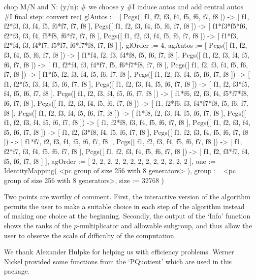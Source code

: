 chop M/N and N: (y/n):                      # we choose y 
#I    induce autos and add central autos
#I  final step: convert
rec( 
  glAutos := [ Pcgs([ f1, f2, f3, f4, f5, f6, f7, f8 ]) -> [ f1, f2*f3, f3, 
          f4, f5, f6*f7, f7, f8 ], 
      Pcgs([ f1, f2, f3, f4, f5, f6, f7, f8 ]) -> 
        [ f1*f3*f5*f6, f2*f3, f3, f4, f5*f8, f6*f7, f7, f8 ], 
      Pcgs([ f1, f2, f3, f4, f5, f6, f7, f8 ]) -> 
        [ f1*f3, f2*f4, f3, f4*f7, f5*f7, f6*f7*f8, f7, f8 ] ], glOrder := 4, 
  agAutos := 
    [ Pcgs([ f1, f2, f3, f4, f5, f6, f7, f8 ]) -> [ f1*f4, f2, f3, f4*f8, f5, 
          f6, f7, f8 ], Pcgs([ f1, f2, f3, f4, f5, f6, f7, f8 ]) -> 
        [ f1, f2*f4, f3, f4*f7, f5, f6*f7*f8, f7, f8 ], 
      Pcgs([ f1, f2, f3, f4, f5, f6, f7, f8 ]) -> 
        [ f1*f5, f2, f3, f4, f5, f6, f7, f8 ], 
      Pcgs([ f1, f2, f3, f4, f5, f6, f7, f8 ]) -> 
        [ f1, f2*f5, f3, f4, f5, f6, f7, f8 ], 
      Pcgs([ f1, f2, f3, f4, f5, f6, f7, f8 ]) -> 
        [ f1, f2, f3*f5, f4, f5, f6, f7, f8 ], 
      Pcgs([ f1, f2, f3, f4, f5, f6, f7, f8 ]) -> 
        [ f1*f6, f2, f3, f4, f5*f7*f8, f6, f7, f8 ], 
      Pcgs([ f1, f2, f3, f4, f5, f6, f7, f8 ]) -> 
        [ f1, f2*f6, f3, f4*f7*f8, f5, f6, f7, f8 ], 
      Pcgs([ f1, f2, f3, f4, f5, f6, f7, f8 ]) -> 
        [ f1*f8, f2, f3, f4, f5, f6, f7, f8 ], 
      Pcgs([ f1, f2, f3, f4, f5, f6, f7, f8 ]) -> 
        [ f1, f2*f8, f3, f4, f5, f6, f7, f8 ], 
      Pcgs([ f1, f2, f3, f4, f5, f6, f7, f8 ]) -> 
        [ f1, f2, f3*f8, f4, f5, f6, f7, f8 ], 
      Pcgs([ f1, f2, f3, f4, f5, f6, f7, f8 ]) -> 
        [ f1*f7, f2, f3, f4, f5, f6, f7, f8 ], 
      Pcgs([ f1, f2, f3, f4, f5, f6, f7, f8 ]) -> 
        [ f1, f2*f7, f3, f4, f5, f6, f7, f8 ], 
      Pcgs([ f1, f2, f3, f4, f5, f6, f7, f8 ]) -> 
        [ f1, f2, f3*f7, f4, f5, f6, f7, f8 ] ], 
  agOrder := [ 2, 2, 2, 2, 2, 2, 2, 2, 2, 2, 2, 2, 2 ], 
  one := IdentityMapping( <pc group of size 256 with 8 generators> ), 
  group := <pc group of size 256 with 8 generators>, size := 32768 )
\endexample

Two points are worthy of comment.
First, the interactive version of the algorithm permits the user to 
make a suitable choice in each step of the algorithm instead of making
one choice at the beginning. Secondly, the output of the `Info' function 
shows the ranks of the $p$-multiplicator and allowable subgroup,
and thus allow the user to observe the scale of difficulty 
of the computation. 


We thank Alexander Hulpke for helping us with efficiency 
problems. Werner Nickel provided some functions from 
the {\GAP} `PQuotient' which are used in this package.

